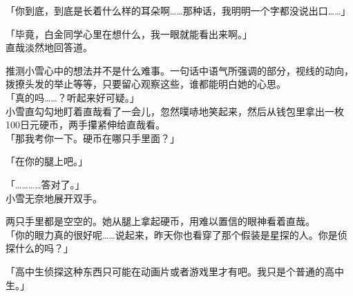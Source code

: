 「你到底，到底是长着什么样的耳朵啊……那种话，我明明一个字都没说出口……」

「毕竟，白金同学心里在想什么，我一眼就能看出来啊。」\\

直哉淡然地回答道。

推测小雪心中的想法并不是什么难事。一句话中语气所强调的部分，视线的动向，拨撩头发的举止等等，只要留心观察这些，谁都能明白她的心思。\\

「真的吗……？听起来好可疑。」\\

小雪直勾勾地盯着直哉看了一会儿，忽然噗哧地笑起来，然后从钱包里拿出一枚100日元硬币，两手攥紧伸给直哉看。\\

「那我考你一下。硬币在哪只手里面？」

「在你的腿上吧。」

「…………答对了。」\\

小雪无奈地展开双手。

两只手里都是空空的。她从腿上拿起硬币，用难以置信的眼神看着直哉。\\

「你的眼力真的很好呢……说起来，昨天你也看穿了那个假装是星探的人。你是侦探什么的吗？」

「高中生侦探这种东西只可能在动画片或者游戏里才有吧。我只是个普通的高中生。」

